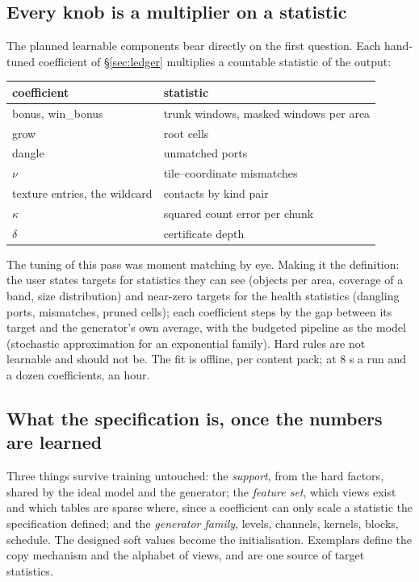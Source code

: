 \documentclass[11pt]{article}
\newcommand{\1}{\mathds{1}}
\begin{document}
\subsection{Every knob is a multiplier on a statistic}

The planned learnable components bear directly on the first question.
Each hand-tuned coefficient of \S\ref{sec:ledger} multiplies a countable
statistic of the output:

\begin{center}\small
\begin{tabular}{@{}l l@{}}
\toprule
coefficient & statistic \\
\midrule
bonus, win\_bonus & trunk windows, masked windows per area \\
grow & root cells \\
dangle & unmatched ports \\
$\nu$ & tile--coordinate mismatches \\
texture entries, the wildcard & contacts by kind pair \\
$\kappa$ & squared count error per chunk \\
$\delta$ & certificate depth \\
\bottomrule
\end{tabular}
\end{center}

\noindent The tuning of this pass was moment matching by eye. Making it the
definition: the user states targets for statistics they can see (objects
per area, coverage of a band, size distribution) and near-zero targets
for the health statistics (dangling ports, mismatches, pruned cells);
each coefficient steps by the gap between its target and the generator's
own average, with the budgeted pipeline as the model (stochastic
approximation for an exponential family). Hard rules are not learnable
and should not be. The fit is offline, per content pack; at 8 s a run and
a dozen coefficients, an hour.

\subsection{What the specification is, once the numbers are learned}

Three things survive training untouched: the \emph{support}, from the hard
factors, shared by the ideal model and the generator; the \emph{feature
set}, which views exist and which tables are sparse where, since a
coefficient can only scale a statistic the specification defined; and
the \emph{generator family}, levels, channels, kernels, blocks, schedule.
The designed soft values become the initialisation. Exemplars define the
copy mechanism and the alphabet of views, and are one source of target
statistics.
\end{document}
